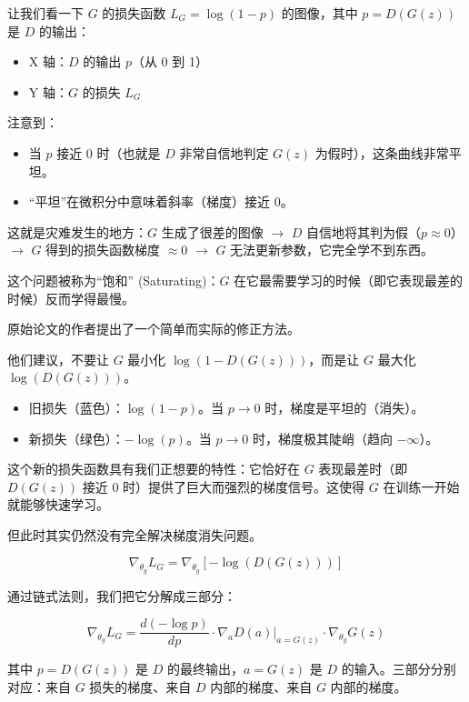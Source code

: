 让我们看一下 \(G\) 的损失函数 \(L_G=\log(1-p)\) 的图像，其中 \(p=D(G(z))\) 是 \(D\) 的输出：

\begin{itemize}
\tightlist
\item
  X 轴：\(D\) 的输出 \(p\)（从 0 到 1）
\item
  Y 轴：\(G\) 的损失 \(L_G\)
\end{itemize}

注意到：

\begin{itemize}
\tightlist
\item
  当 \(p\) 接近 0 时（也就是 \(D\) 非常自信地判定 \(G(z)\) 为假时），这条曲线非常平坦。
\item
  ``平坦''在微积分中意味着斜率（梯度）接近 0。
\end{itemize}

这就是灾难发生的地方：\(G\) 生成了很差的图像 \(\rightarrow\) \(D\) 自信地将其判为假（\(p\approx 0\)）\(\rightarrow\) \(G\) 得到的损失函数梯度 \(\approx 0\) \(\rightarrow\) \(G\) 无法更新参数，它完全学不到东西。

这个问题被称为``饱和'' (Saturating)：\(G\) 在它最需要学习的时候（即它表现最差的时候）反而学得最慢。

原始论文的作者提出了一个简单而实际的修正方法。

他们建议，不要让 \(G\) 最小化 \(\log(1-D(G(z)))\)，而是让 \(G\) 最大化 \(\log(D(G(z)))\)。

\begin{itemize}
\tightlist
\item
  旧损失（蓝色）：\(\log(1-p)\)。当 \(p \rightarrow 0\) 时，梯度是平坦的（消失）。
\item
  新损失（绿色）：\(-\log(p)\)。当 \(p \rightarrow 0\) 时，梯度极其陡峭（趋向 \(-\infty\)）。
\end{itemize}

这个新的损失函数具有我们正想要的特性：它恰好在 \(G\) 表现最差时（即 \(D(G(z))\) 接近 0 时）提供了巨大而强烈的梯度信号。这使得 \(G\) 在训练一开始就能够快速学习。

但此时其实仍然没有完全解决梯度消失问题。

\[
\nabla_{\theta_g} L_G = \nabla_{\theta_g}[-\log(D(G(z)))]
\]

通过链式法则，我们把它分解成三部分：

\[
\nabla_{\theta_g} L_G =
\frac{d(-\log p)}{dp}
\cdot
\nabla_a D(a)\rvert_{a=G(z)}
\cdot
\nabla_{\theta_g} G(z)
\]

其中 \(p=D(G(z))\) 是 \(D\) 的最终输出，\(a=G(z)\) 是 \(D\) 的输入。三部分分别对应：来自 \(G\) 损失的梯度、来自 \(D\) 内部的梯度、来自 \(G\) 内部的梯度。

